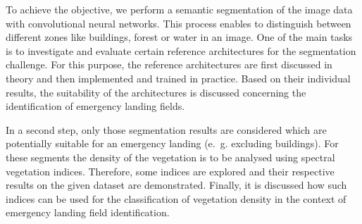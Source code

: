 To achieve the objective, we perform a semantic segmentation of the image data with convolutional neural networks. This process enables to distinguish between different zones like buildings, forest or water in an image. One of the main tasks is to investigate and evaluate certain reference architectures for the segmentation challenge. For this purpose, the reference architectures are first discussed in theory and then implemented and trained in practice. Based on their individual results, the suitability of the architectures is discussed concerning the identification of emergency landing fields.

In a second step, only those segmentation results are considered which are potentially suitable for an emergency landing (e.~g. excluding buildings). For these segments the density of the vegetation is to be analysed using spectral vegetation indices. Therefore, some indices are explored and their respective results on the given dataset are demonstrated. Finally, it is discussed how such indices can be used for the classification of vegetation density in the context of emergency landing field identification.

\clearpage